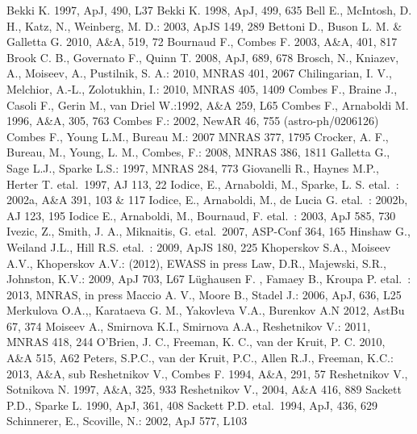 \documentclass[traditabstract]{aa}
\def\ts     {\thinspace}
\def\etal   {{\rm et\ts al.}~}
\begin{document}
\begin{thebibliography}{}
\bibitem{}Bekki K. 1997, ApJ, 490, L37
\bibitem{}Bekki K. 1998, ApJ, 499, 635
\bibitem{}Bell E., McIntosh, D. H., Katz, N., Weinberg, M. D.: 2003, ApJS 149, 289
\bibitem{}Bettoni D., Buson L. M. \& Galletta G. 2010, A\&A, 519, 72
\bibitem{}Bournaud F., Combes F. 2003, A\&A,  401, 817
\bibitem{}Brook C. B., Governato F., Quinn T. 2008, ApJ, 689, 678
\bibitem{}Brosch, N., Kniazev, A., Moiseev, A., Pustilnik, S. A.: 2010, MNRAS 401, 2067
\bibitem{}Chilingarian, I. V., Melchior, A.-L., Zolotukhin, I.: 2010, MNRAS 405, 1409
\bibitem{}Combes F., Braine J., Casoli F., Gerin M., van Driel W.:1992, A\&A  259, L65
\bibitem{}Combes F., Arnaboldi M. 1996, A\&A, 305, 763
\bibitem{}Combes F.: 2002, NewAR 46, 755 (astro-ph/0206126)
\bibitem{}Combes F., Young L.M., Bureau M.: 2007 MNRAS 377, 1795
\bibitem{}Crocker, A. F., Bureau, M., Young, L. M., Combes, F.: 2008, MNRAS 386, 1811 %
\bibitem{}Galletta G., Sage L.J., Sparke L.S.: 1997, MNRAS 284, 773
\bibitem{}Giovanelli R., Haynes M.P., Herter T. \etal 1997, AJ 113, 22
\bibitem{}Iodice, E., Arnaboldi, M., Sparke, L. S. \etal: 2002a,   A\&A 391, 103 \& 117
\bibitem{}Iodice, E., Arnaboldi, M., de Lucia G.  \etal: 2002b,  AJ 123, 195
\bibitem{}Iodice E., Arnaboldi, M., Bournaud, F. \etal :  2003, ApJ 585, 730
\bibitem{}Ivezic, Z., Smith, J. A., Miknaitis, G. \etal 2007, ASP-Conf 364, 165
\bibitem{}Hinshaw G., Weiland J.L., Hill R.S.  \etal: 2009, ApJS 180, 225
\bibitem{}Khoperskov S.A., Moiseev A.V., Khoperskov A.V.:  (2012),   EWASS in press
\bibitem{}Law, D.R., Majewski, S.R., Johnston, K.V.: 2009, ApJ 703, L67
\bibitem{}L\"ughausen F. , Famaey B., Kroupa  P. \etal: 2013, MNRAS, in press
\bibitem{}Maccio A. V., Moore B., Stadel J.: 2006, ApJ, 636, L25
\bibitem{}Merkulova O.A.,, Karataeva G. M., Yakovleva V.A.,  Burenkov A.N 2012, AstBu 67, 374
\bibitem{}Moiseev A., Smirnova K.I., Smirnova A.A., Reshetnikov V.: 2011, MNRAS 418, 244
\bibitem{}O'Brien, J. C., Freeman, K. C., van der Kruit, P. C. 2010, A\&A 515, A62
\bibitem{}Peters, S.P.C., van der Kruit, P.C., Allen R.J., Freeman, K.C.: 2013, A\&A, sub
\bibitem{}Reshetnikov V., Combes F. 1994, A\&A, 291, 57
\bibitem{}Reshetnikov V., Sotnikova N. 1997, A\&A, 325, 933
\bibitem{}Reshetnikov V., 2004, A\&A 416, 889
\bibitem{}Sackett P.D., Sparke L. 1990, ApJ, 361, 408
\bibitem{}Sackett P.D. \etal 1994, ApJ, 436, 629
\bibitem{}Schinnerer, E., Scoville, N.: 2002, ApJ 577, L103 %

\end{thebibliography}
\end{document}
